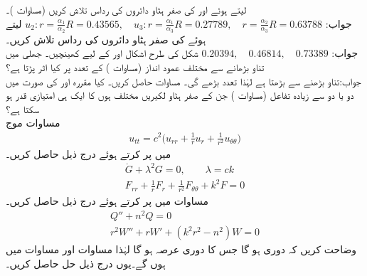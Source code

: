 \quad
{} لیتے ہوئے  اور  کی صفر ہٹاو دائروں کی رداس تلاش کریں (مساوات )۔\\
جواب:\quad
$u_2:r=\tfrac{\alpha_1}{\alpha_2}R=0.43565,\quad u_3:r=\tfrac{\alpha_1}{\alpha_3}R=0.27789, \quad r=\tfrac{\alpha_2}{\alpha_3}R=0.63788$
\quad
{} لیتے ہوئے  کی صفر ہٹاو دائروں کی رداس تلاش کریں۔\\
جواب:\quad
$0.20394, \quad 0.46814,\quad 0.73389$
\quad
شکل  کی طرح اشکال  اور  کے لیے کھینچیں۔
\quad
جھلی میں تناو بڑھانے سے مختلف عمود انداز (مساوات ) کے تعدد پر کیا اثر پڑتا ہے؟\\
جواب:\quad تناو بڑھنے سے  بڑھتا ہے لہٰذا تعدد بڑھے گی۔
\quad 
مساوات  حاصل کریں۔
\quad
کیا مقررہ  اور  کی صورت میں دو یا دو سے زیادہ تفاعل  (مساوات ) جن کے صفر ہٹاو لکیریں مختلف ہوں کا ایک ہی امتیازی قدر ہو سکتا ہے؟
\quad {}\\
مساوات موج
\begin{align}\label{مساوات_جزوی_سوال_الف}
u_{tt}=c^2\big(u_{rr}+\frac{1}{r}u_r+\frac{1}{r^2}u_{\theta \theta}\big)
\end{align}
 میں  پر کرتے ہوئے درج ذیل حاصل کریں۔
\begin{align}
\ddot{G}+\lambda^2G=0,\quad \quad \lambda=ck\label{مساوات_جزوی_سوال_ب}\\
F_{rr}+\frac{1}{r}F_r+\frac{1}{r^2}F_{\theta\theta}+k^2F=0\label{مساوات_جزوی_سوال_پ}
\end{align}
\quad
مساوات  میں  پر کرتے ہوئے درج ذیل حاصل کریں۔
\begin{align}
Q''+n^2Q=0\label{مساوات_جزوی_سوال_ت}\\
r^2W''+rW'+(k^2r^2-n^2)W=0\label{مساوات_جزوی_سوال_ٹ}
\end{align}
\quad
وضاحت کریں کہ  دوری ہو گا جس کا دوری عرصہ  ہو گا لہٰذا مساوات  اور مساوات  میں  ہوں گے۔یوں درج ذیل حل حاصل کریں۔
